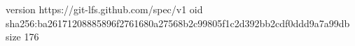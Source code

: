 version https://git-lfs.github.com/spec/v1
oid sha256:ba26171208885896f2761680a27568b2c99805f1c2d392bb2cdf0ddd9a7a99db
size 176
